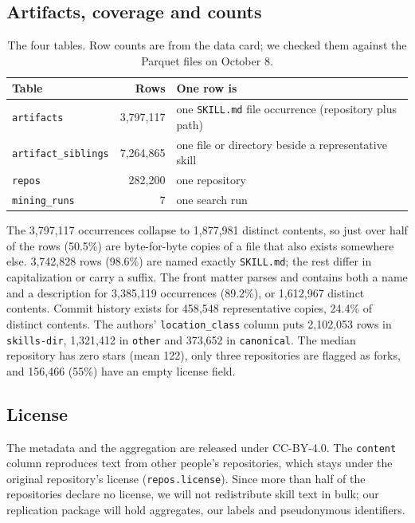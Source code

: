 \documentclass[11pt]{article}
\begin{document}
\subsection{Artifacts, coverage and counts}
\begin{table}[h]
\centering\small
\begin{tabular}{lrl}
\toprule
Table & Rows & One row is \\
\midrule
\texttt{artifacts} & 3{,}797{,}117 & one \texttt{SKILL.md} file occurrence (repository plus path) \\
\texttt{artifact\_siblings} & 7{,}264{,}865 & one file or directory beside a representative skill \\
\texttt{repos} & 282{,}200 & one repository \\
\texttt{mining\_runs} & 7 & one search run \\
\bottomrule
\end{tabular}
\caption{The four tables. Row counts are from the data card; we checked them against the Parquet files on October 8.}
\end{table}

The 3{,}797{,}117 occurrences collapse to 1{,}877{,}981 distinct contents, so just over half of the rows (50.5\%) are
byte-for-byte copies of a file that also exists somewhere else. 3{,}742{,}828 rows (98.6\%) are named exactly
\texttt{SKILL.md}; the rest differ in capitalization or carry a suffix. The front matter parses and contains both a name and a
description for 3{,}385{,}119 occurrences (89.2\%), or 1{,}612{,}967 distinct contents. Commit history exists for 458{,}548
representative copies, 24.4\% of distinct contents. The authors' \texttt{location\_class} column puts 2{,}102{,}053 rows in
\texttt{skills-dir}, 1{,}321{,}412 in \texttt{other} and 373{,}652 in \texttt{canonical}. The median repository has zero stars
(mean 122), only three repositories are flagged as forks, and 156{,}466 (55\%) have an empty license field.

\subsection{License}
The metadata and the aggregation are released under CC-BY-4.0. The \texttt{content} column reproduces text from other
people's repositories, which stays under the original repository's license (\texttt{repos.license}). Since more than half of
the repositories declare no license, we will not redistribute skill text in bulk; our replication package will hold
aggregates, our labels and pseudonymous identifiers.
\end{document}
